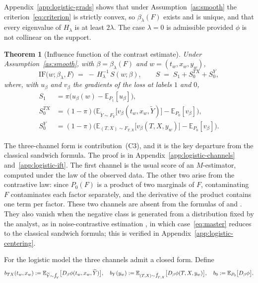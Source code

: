 \documentclass[11pt]{article}
\theoremstyle{plain}
\newtheorem{theorem}{Theorem}
\theoremstyle{definition}
\theoremstyle{remark}
\newcommand{\pE}{\ensuremath{\mathbb{E}}}
\newcommand{\pf}[1]{\ensuremath{\,\mathlarger{\textit{f}}_{#1}}}
\newcommand{\ratio}{\ensuremath{\pi}}
\newcommand{\IF}{\mathrm{IF}}
\newcommand{\score}{S}
\begin{document}
Appendix~\ref{app:logistic-grads} shows that under Assumption~\ref{as:smooth} the
criterion~\eqref{eq:criterion} is strictly convex, so $\beta_\lambda(F)$ exists and is
unique, and that every eigenvalue of $H_\lambda$ is at least $2\lambda$. The case
$\lambda = 0$ is admissible provided $\phi$ is not collinear on the support.

\begin{theorem}[Influence function of the contrast estimate]
\label{thm:channels}
Under Assumption~\ref{as:smooth}, with $\beta = \beta_\lambda(F)$ and
$w = (t_w,x_w,y_w)$,
\begin{equation}
\IF\big(w;\beta_\lambda,F\big) \;=\; -\,H_\lambda^{-1}\,\score(w;\beta),
\qquad
\score \;=\; \score_1 + \score_0^{TX} + \score_0^{Y},
\label{eq:master}
\end{equation}
where, with $u_\beta$ and $v_\beta$ the gradients of the loss at labels $1$ and $0$,
\begin{equation}
\begin{aligned}
\score_1 &= \ratio\Big( u_\beta(w) - \pE_{P_1}[u_\beta] \Big), \\
\score_0^{TX} &= (1-\ratio)\Big(
\pE_{\widetilde Y \sim F_Y}\big[ v_\beta(t_w,x_w,\widetilde Y) \big]
- \pE_{P_0}[v_\beta] \Big), \\
\score_0^{Y} &= (1-\ratio)\Big(
\pE_{(T,X) \sim F_{T,X}}\big[ v_\beta(T,X,y_w) \big]
- \pE_{P_0}[v_\beta] \Big).
\end{aligned}
\label{eq:channels}
\end{equation}
\end{theorem}

The three-channel form is contribution~(C3), and it is the key departure from the
classical sandwich formula. The proof is in Appendix~\ref{app:logistic-channels}
and~\ref{app:logistic-ift}. The first channel is the usual score of an $M$-estimator,
computed under the law of the observed data. The other two arise from the contrastive law: since $P_0(F)$ is a product
of two marginals of $F$, contaminating $F$ contaminates each factor separately, and the
derivative of the product contains one term per factor. These two channels are absent
from the formulas of \citet{avella2017} and \citet{kohliang2017}. They also vanish when
the negative class is generated from a distribution fixed by the analyst, as in
noise-contrastive estimation \citep{gutmann2010nce}, in which case~\eqref{eq:master}
reduces to the classical sandwich formula; this is verified in
Appendix~\ref{app:logistic-centering}.

For the logistic model the three channels admit a closed form. Define
\begin{equation}
b_{TX}(t_w,x_w) := \pE_{\widetilde Y \sim \pf{Y}}
\big[ D_\beta \phi (t_w,x_w,\widetilde Y) \big],
\quad
b_Y(y_w) := \pE_{(T,X) \sim \pf{T,X}}
\big[ D_\beta \phi (T,X,y_w) \big],
\quad
b_0 := \pE_{P_0}\big[ D_\beta \phi \big].
\label{eq:b-channels}
\end{equation}
\end{document}
